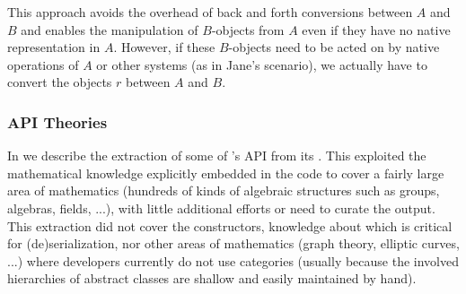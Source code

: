 This approach avoids the overhead of back and forth conversions between $A$ and $B$ and enables the manipulation of $B$-objects from $A$ even if they have no native representation in $A$.
However, if these $B$-objects need to be acted on by native operations of $A$ or other systems (as in Jane's scenario), we actually have to convert the objects $r$ between $A$ and $B$.


%

\subsubsection{\Sage API Theories}

In \cite{DehKohKon:iop16} we describe the extraction of some of \Sage's API from its .
This exploited the mathematical knowledge explicitly embedded in the code to cover a fairly large area  of mathematics (hundreds of kinds of algebraic structures such as groups, algebras, fields, ...), with little additional efforts or need to curate the output.
This extraction did not cover the constructors, knowledge about
which is critical for (de)serialization, nor other areas of
mathematics (graph theory, elliptic curves, ...) where \Sage
developers currently do not use categories (usually because the
involved hierarchies of abstract classes are shallow and easily maintained by hand).

